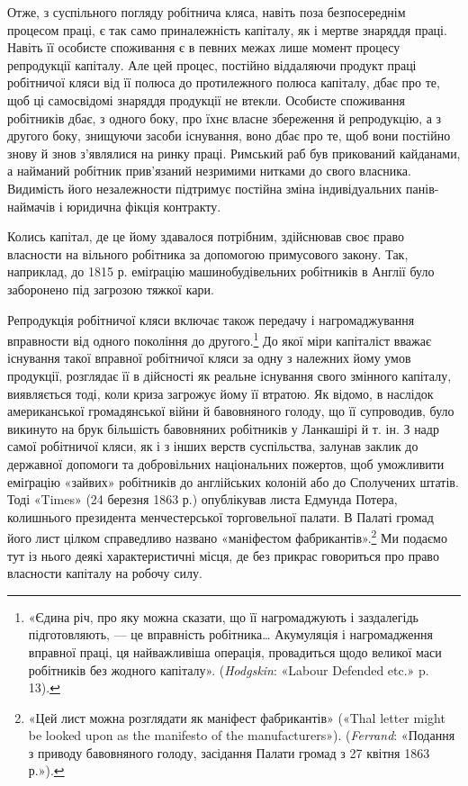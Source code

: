 Отже, з суспільного погляду робітнича кляса, навіть поза
безпосереднім процесом праці, є так само приналежність капіталу,
як і мертве знаряддя праці. Навіть її особисте споживання
є в певних межах лише момент процесу репродукції капіталу.
Але цей процес, постійно віддаляючи продукт праці робітничої
кляси від її полюса до протилежного полюса капіталу, дбає
про те, щоб ці самосвідомі знаряддя продукції не втекли. Особисте
споживання робітників дбає, з одного боку, про їхнє власне збереження
й репродукцію, а з другого боку, знищуючи засоби
існування, воно дбає про те, щоб вони постійно знову й знов
з’являлися на ринку праці. Римський раб був прикований
кайданами, а найманий робітник прив’язаний незримими нитками
до свого власника. Видимість його незалежности підтримує
постійна зміна індивідуальних панів-наймачів і юридична фікція
контракту.

Колись капітал, де це йому здавалося потрібним, здійснював
своє право власности на вільного робітника за допомогою примусового
закону. Так, наприклад, до 1815 р. еміґрацію машинобудівельних
робітників в Англії було заборонено під загрозою
тяжкої кари.

Репродукція робітничої кляси включає також передачу і
нагромаджування вправности від одного покоління до другого.\footnote{
«Єдина річ, про яку можна сказати, що її нагромаджують і заздалегідь
підготовляють, — це вправність робітника\dots{} Акумуляція і нагромадження
вправної праці, ця найважливіша операція, провадиться щодо
великої маси робітників без жодного капіталу». (\emph{Hodgskin}: «Labour
Defended etc.» p. 13).
}
До якої міри капіталіст вважає існування такої вправної
робітничої кляси за одну з належних йому умов продукції, розглядає
її в дійсності як реальне існування свого змінного капіталу,
виявляється тоді, коли криза загрожує йому її втратою.
Як відомо, в наслідок американської громадянської війни й
бавовняного голоду, що її супроводив, було викинуто на брук
більшість бавовняних робітників у Ланкашірі й т. ін. З надр
самої робітничої кляси, як і з інших верств суспільства, залунав
заклик до державної допомоги та добровільних національних
пожертов, щоб уможливити еміґрацію «зайвих» робітників до
англійських колоній або до Сполучених штатів. Тоді «Times»
(24 березня 1863 р.) опублікував листа Едмунда Потера, колишнього
президента менчестерської торговельної палати. В Палаті
громад його лист цілком справедливо названо «маніфестом
фабрикантів».\footnote{
«Цей лист можна розглядати як маніфест фабрикантів» («Thal
letter might be looked upon as the manifesto of the manufacturers»).
(\emph{Ferrand}: «Подання з приводу бавовняного голоду, засідання Палати
громад з 27 квітня 1863 р.»).
} Ми подаємо тут із нього деякі характеристичні
місця, де без прикрас говориться про право власности капіталу
на робочу силу.

